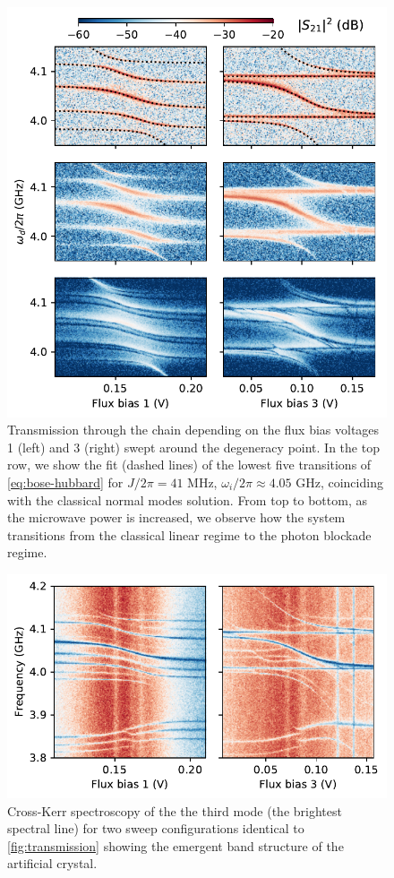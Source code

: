 \documentclass[%
 aps, prl,
 amsmath,amssymb,
 reprint,%
superscriptaddress
]{revtex4-2}
\begin{document}
\begin{figure}
	\centering
	\includegraphics[width=1\linewidth]{Pictures/fig2}
	\caption{Transmission through the chain depending on the flux bias voltages 1 (left) and 3 (right) swept around the degeneracy point. In the top row, we show the fit (dashed lines) of the lowest five transitions of \autoref{eq:bose-hubbard} for $J/2\pi = 41$ MHz, $\omega_i/2\pi \approx 4.05$ GHz, coinciding with the classical normal modes solution. From top to bottom, as the microwave power is increased, we observe how the system transitions from the classical linear regime to the photon blockade regime.}
	\label{fig:transmission}
\end{figure}


\begin{figure}
	\centering
	\includegraphics[width=1\linewidth]{Pictures/cktt}
	\caption{Cross-Kerr spectroscopy of the the third mode (the brightest spectral line) for two sweep configurations identical to \autoref{fig:transmission} showing the emergent band structure of the artificial crystal.}
	\label{fig:cktt}
\end{figure}
\end{document}
